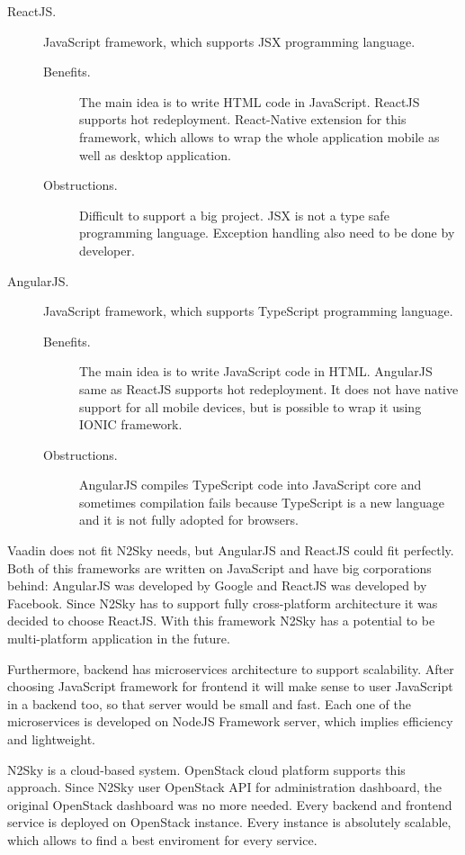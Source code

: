 \begin{description}
\item[ReactJS.]  JavaScript framework, which supports JSX programming language. 
\begin{description} 
\item[Benefits.] The main idea is to write HTML code in JavaScript. ReactJS supports hot redeployment.  React-Native extension for this framework, which allows to wrap the whole application mobile as well as desktop application.
\item[Obstructions.]  Difficult to support a big project. JSX is not a type safe programming language. Exception handling also need to be done by developer.  
\end{description}
\item[AngularJS.] JavaScript framework, which supports TypeScript programming language.
\begin{description} 
\item[Benefits.] The main idea is to write JavaScript code in HTML.  AngularJS same as ReactJS supports hot redeployment.  It does not have native support for all mobile devices, but is possible to wrap it using IONIC framework. 
\item[Obstructions.]  AngularJS compiles TypeScript code into JavaScript core and sometimes compilation fails because TypeScript is a new language and it is not fully adopted for browsers. 
\end{description}
\end{description}
 
 Vaadin does not fit N2Sky needs, but AngularJS and ReactJS could fit perfectly. Both of this frameworks are written on JavaScript and have big corporations behind: AngularJS was developed by Google and ReactJS was developed by Facebook. Since N2Sky has to support fully cross-platform architecture it was decided to choose ReactJS. With this framework N2Sky has a potential to be multi-platform application in the future. 
 

Furthermore, backend has microservices architecture to support scalability. After choosing JavaScript framework for frontend it will make sense to user JavaScript in a backend too, so that server would be small and fast. Each one of the microservices is developed on NodeJS Framework server, which implies efficiency and lightweight. 

N2Sky is a cloud-based system. OpenStack cloud platform supports this approach. Since N2Sky user OpenStack API for administration dashboard, the original OpenStack dashboard was no more needed. Every backend and frontend service is deployed on OpenStack instance. Every instance is absolutely scalable, which allows to find a best enviroment for every service. 

